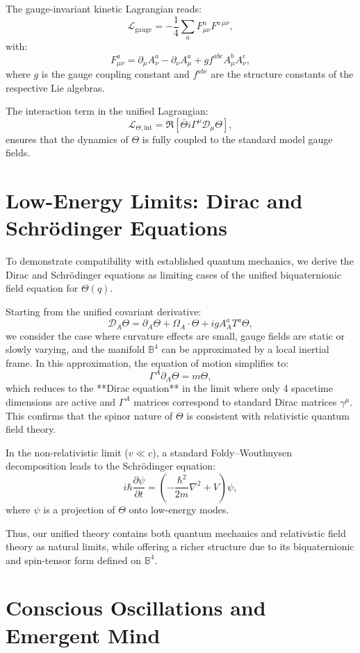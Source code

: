 \documentclass[12pt]{article}
\begin{document}
The gauge-invariant kinetic Lagrangian reads:
\[
\mathcal{L}_{\text{gauge}} = -\frac{1}{4} \sum_a F^{a}_{\mu\nu} F^{a\,\mu\nu},
\]
with:
\[
F^a_{\mu\nu} = \partial_\mu A^a_\nu - \partial_\nu A^a_\mu + g f^{abc} A^b_\mu A^c_\nu,
\]
where \(g\) is the gauge coupling constant and \(f^{abc}\) are the structure constants of the respective Lie algebras.

The interaction term in the unified Lagrangian:
\[
\mathcal{L}_{\Theta, \text{int}} = \Re \left[ \bar{\Theta} i \Gamma^\mu \mathcal{D}_\mu \Theta \right],
\]
ensures that the dynamics of \(\Theta\) is fully coupled to the standard model gauge fields.

\section{Low-Energy Limits: Dirac and Schrödinger Equations}

To demonstrate compatibility with established quantum mechanics, we derive the Dirac and Schrödinger equations as limiting cases of the unified biquaternionic field equation for \(\Theta(q)\).

Starting from the unified covariant derivative:
\[
\mathcal{D}_A \Theta = \partial_A \Theta + \Omega_A \cdot \Theta + i g A_A^a T^a \Theta,
\]
we consider the case where curvature effects are small, gauge fields are static or slowly varying, and the manifold \(\mathbb{B}^4\) can be approximated by a local inertial frame. In this approximation, the equation of motion simplifies to:
\[
\Gamma^A \partial_A \Theta = m \Theta,
\]
which reduces to the **Dirac equation** in the limit where only 4 spacetime dimensions are active and \(\Gamma^A\) matrices correspond to standard Dirac matrices \(\gamma^\mu\). This confirms that the spinor nature of \(\Theta\) is consistent with relativistic quantum field theory.

In the non-relativistic limit (\(v \ll c\)), a standard Foldy–Wouthuysen decomposition leads to the Schrödinger equation:
\[
i \hbar \frac{\partial \psi}{\partial t} = \left( -\frac{\hbar^2}{2m} \nabla^2 + V \right) \psi,
\]
where \(\psi\) is a projection of \(\Theta\) onto low-energy modes.

Thus, our unified theory contains both quantum mechanics and relativistic field theory as natural limits, while offering a richer structure due to its biquaternionic and spin-tensor form defined on \(\mathbb{B}^4\).

\section{Conscious Oscillations and Emergent Mind}
\end{document}
